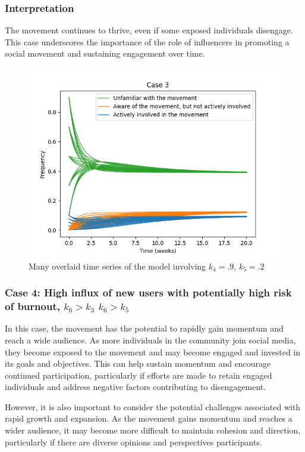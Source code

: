 \documentclass{article}
\begin{document}
    \subsubsection*{Interpretation} The movement continues to thrive, even if some exposed individuals disengage. This case underscores the importance of the role of influencers in promoting a social movement and sustaining engagement over time. 

    \begin{figure}[H]

        \centering
        \includegraphics[width=\textwidth]{simulation/plots/case3.png}   
        \caption{Many overlaid time series of the model involving \mbox{$k_4=.9$}, \mbox{$k_5=.2$}}
        \label{fig:case3}
    \end{figure}


    \subsubsection*{Case 4: High influx of new users with potentially high risk of burnout, $k_6 > k_3$  $k_6 > k_5$}
   In this case, the movement has the potential to rapidly gain momentum and reach a wide audience. As more individuals in the community join social media, they become exposed to the movement and may become engaged and invested in its goals and objectives. This can help sustain momentum and encourage continued participation, particularly if efforts are made to retain engaged individuals and address negative factors contributing to disengagement. 
   
   However, it is also important to consider the potential challenges associated with rapid growth and expansion. As the movement gains momentum and reaches a wider audience, it may become more difficult to maintain cohesion and direction, particularly if there are diverse opinions and perspectives  participants.
   
\end{document}

